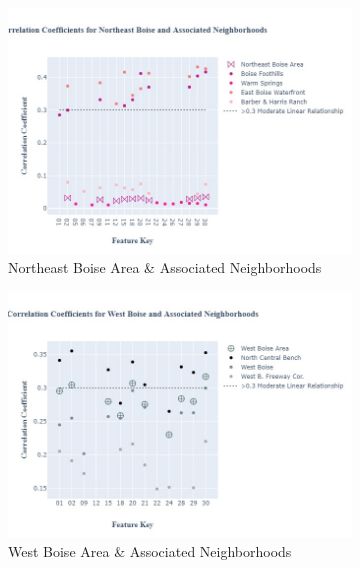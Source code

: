 \documentclass{article}
\begin{document}
\begin{figure}[H]
\begin{subfigure}[b]{0.45\textwidth}
         \includegraphics[width=\textwidth]{images/NE_fig.jpg}
         \caption{Northeast Boise Area \& Associated Neighborhoods}
         \label{fig: ne_ccg}
     \end{subfigure}
               \begin{subfigure}[b]{0.45\textwidth}
         \centering
         \includegraphics[width=\textwidth]{images/WB_fig.jpg}
         \caption{West Boise Area \& Associated Neighborhoods}
         \label{fig: wb_ccg}
     \end{subfigure}
               \begin{subfigure}[b]{0.45\textwidth}
         \centering

\end{subfigure}
\end{figure}
\end{document}
